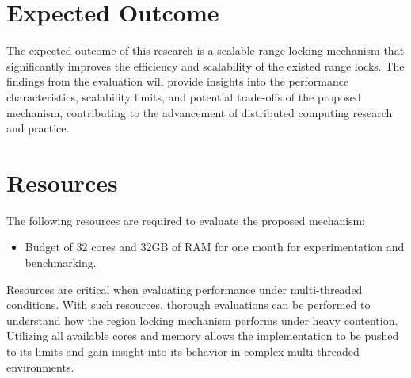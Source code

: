 \section{Expected Outcome}
The expected outcome of this research is a scalable range locking mechanism that significantly improves the efficiency and scalability of the existed range locks. The findings from the evaluation will provide insights into the performance characteristics, scalability limits, and potential trade-offs of the proposed mechanism, contributing to the advancement of distributed computing research and practice.

\section{Resources}
The following resources are required to evaluate the proposed mechanism:
\begin{itemize}
    \item Budget of 32 cores and 32GB of RAM for one month for experimentation and benchmarking.
\end{itemize}
Resources are critical when evaluating performance under multi-threaded conditions. With such resources, thorough evaluations can be performed to understand how the region locking mechanism performs under heavy contention. Utilizing all available cores and memory allows the implementation to be pushed to its limits and gain insight into its behavior in complex multi-threaded environments.
